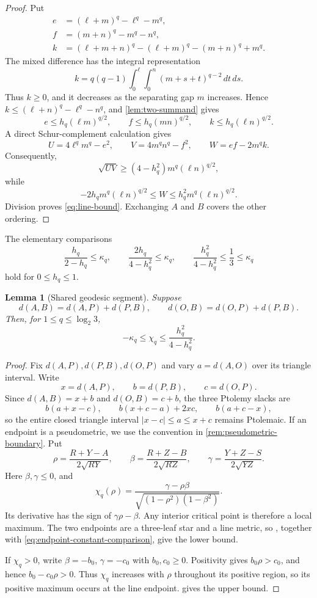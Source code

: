 \documentclass[11pt]{amsart}
\newtheorem{lemma}[lemma]{Lemma}
\theoremstyle{definition}
\theoremstyle{remark}
\begin{document}
\begin{proof}
Put
\begin{align*}
 e&=(\ell+m)^q-\ell^q-m^q,\\
 f&=(m+n)^q-m^q-n^q,\\
 k&=(\ell+m+n)^q-(\ell+m)^q-(m+n)^q+m^q.
\end{align*}
The mixed difference has the integral representation
\[
 k=q(q-1)\int_0^{\ell}\int_0^n(m+s+t)^{q-2}\,dt\,ds.
\]
Thus \(k\geq0\), and it decreases as the separating gap \(m\) increases. Hence $k\le(\ell+n)^q-\ell^q-n^q$, and \cref{lem:two-summand} gives
\[
 e\leq h_q(\ell m)^{q/2},
 \qquad
 f\leq h_q(mn)^{q/2},
 \qquad
 k\leq h_q(\ell n)^{q/2}.
\]
A direct Schur-complement calculation gives
\[
 U=4\ell^qm^q-e^2,
 \qquad
 V=4m^qn^q-f^2,
 \qquad
 W=ef-2m^qk.
\]
Consequently,
\[
 \sqrt{UV}\geq(4-h_q^2)m^q(\ell n)^{q/2},
\]
while
\[
 -2h_qm^q(\ell n)^{q/2}
 \leq W\leq
 h_q^2m^q(\ell n)^{q/2}.
\]
Division proves \eqref{eq:line-bound}. Exchanging \(A\) and \(B\) covers the other ordering.
\end{proof}

The elementary comparisons
\begin{equation}\label{eq:endpoint-constant-comparison}
 \frac{h_q}{2-h_q}\leq\kappa_q,
 \qquad
 \frac{2h_q}{4-h_q^2}\leq\kappa_q,
 \qquad
 \frac{h_q^2}{4-h_q^2}\leq\frac13\leq\kappa_q
\end{equation}
hold for \(0\leq h_q\leq1\).

\begin{lemma}[Shared geodesic segment]\label{lem:shared-segment}
Suppose
\[
 d(A,B)=d(A,P)+d(P,B),
 \qquad
 d(O,B)=d(O,P)+d(P,B).
\]
Then, for \(1\leq q\leq\log_2 3\),
\[
 -\kappa_q\leq\chi_q\leq\frac{h_q^2}{4-h_q^2}.
\]
\end{lemma}

\begin{proof}
Fix \(d(A,P),d(P,B),d(O,P)\) and vary \(a=d(A,O)\) over its triangle interval. Write
\[
 x=d(A,P),\qquad b=d(P,B),\qquad c=d(O,P).
\]
Since \(d(A,B)=x+b\) and \(d(O,B)=c+b\), the three Ptolemy slacks are
\[
 b(a+x-c),\qquad b(x+c-a)+2xc,\qquad b(a+c-x),
\]
so the entire closed triangle interval \( |x-c|\le a\le x+c\) remains Ptolemaic. If an endpoint is a pseudometric, we use the convention in \cref{rem:pseudometric-boundary}. Put
\[
 \rho=\frac{R+Y-A}{2\sqrt{RY}},
 \qquad
 \beta=\frac{R+Z-B}{2\sqrt{RZ}},
 \qquad
 \gamma=\frac{Y+Z-S}{2\sqrt{YZ}}.
\]
Here \(\beta,\gamma\leq0\), and
\[
 \chi_q(\rho)=
 \frac{\gamma-\rho\beta}
 {\sqrt{(1-\rho^2)(1-\beta^2)}}.
\]
Its derivative has the sign of \(\gamma\rho-\beta\). Any interior critical point is therefore a local maximum. The two endpoints are a three-leaf star and a line metric, so , together with \eqref{eq:endpoint-constant-comparison}, give the lower bound.

If \(\chi_q>0\), write \(\beta=-b_0\), \(\gamma=-c_0\) with \(b_0,c_0\geq0\). Positivity gives \(b_0\rho>c_0\), and hence \(b_0-c_0\rho>0\). Thus \(\chi_q\) increases with \(\rho\) throughout its positive region, so its positive maximum occurs at the line endpoint.  gives the upper bound.
\end{proof}
\end{document}
